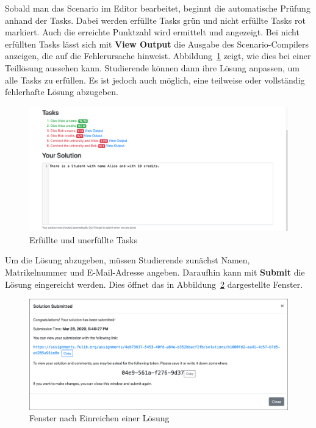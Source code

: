 Sobald man das Scenario im Editor bearbeitet, beginnt die automatische Prüfung anhand der Tasks.
Dabei werden erfüllte Tasks grün und nicht erfüllte Tasks rot markiert.
Auch die erreichte Punktzahl wird ermittelt und angezeigt.
Bei nicht erfüllten Tasks lässt sich mit \textbf{View Output} die Ausgabe des Scenario-Compilers anzeigen, die auf die Fehlerursache hinweist.
Abbildung~\ref{fig:solve-tasks} zeigt, wie dies bei einer Teillösung aussehen kann.
Studierende können dann ihre Lösung anpassen, um alle Tasks zu erfüllen.
Es ist jedoch auch möglich, eine teilweise oder vollständig fehlerhafte Lösung abzugeben.

\begin{figure}
    \centering
    \includegraphics[width=\textwidth]{chapter/fulib.org/img/solve-tasks.png}
    \caption{Erfüllte und unerfüllte Tasks}
    \label{fig:solve-tasks}
\end{figure}

Um die Lösung abzugeben, müssen Studierende zunächst Namen, Matrikelnummer und E-Mail-Adresse angeben.
Daraufhin kann mit \textbf{Submit} die Lösung eingereicht werden.
Dies öffnet das in Abbildung~\ref{fig:solution-submitted} dargestellte Fenster.

\begin{figure}
    \centering
    \includegraphics[width=\textwidth]{chapter/fulib.org/img/solution-submitted.png}
    \caption{Fenster nach Einreichen einer Lösung}
    \label{fig:solution-submitted}
\end{figure}

